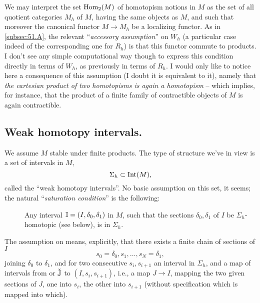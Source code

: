We may interpret the set $\operatorname{Hom}_2(M)$ of homotopism notions in $M$ as
the set of all quotient categories $M_h$ of $M$, having the same
objects as $M$, and such that moreover the canonical functor $M\to
M_h$ be a localizing functor. As in \ref{subsec:51.A}, the relevant
``\emph{accessory assumption}'' on $W_h$ (a particular case indeed of
the corresponding one for $R_h$) is that this functor commute to
products. I don't see any simple computational way though to express
this condition directly in terms of $W_h$, as previously in terms of
$R_h$. I would only like to notice here a consequence of this
assumption (I doubt it is equivalent to it), namely that \emph{the
  cartesian product of two homotopisms is again a homotopism} -- which
implies, for instance, that the product of a finite family
of contractible objects of $M$ is again contractible.

\subsection[Homotopy interval structures]{Weak homotopy intervals.}
\label{subsec:51.C}
We assume $M$ stable under finite products. The type of structure
we've in view is a set of intervals in $M$,
\[\Sigma_h\subset\operatorname{Int}(M),\]
called the ``weak homotopy intervals''. No basic assumption on this
set, it seems; the natural ``\emph{saturation condition}'' is the
following:
\begin{description}
\item[] Any interval
  ${\mathbb{I}}=(I,\delta_0,\delta_1)$ in $M$, such that the sections
  $\delta_0,\delta_1$ of $I$ be $\Sigma_h$-homotopic (see below), is
  in $\Sigma_h$.
\end{description}

The assumption on \bI{} means, explicitly, that there exists a finite
chain of sections of $I$
\[s_0=\delta_0, s_1, \dots, s_N=\delta_1,\]
joining $\delta_0$ to $\delta_1$, and for two consecutive
$s_i,s_{i+1}$ an interval \bJ{} in $\Sigma_h$, and a map of intervals
from \bJ{} or $\check{{\mathbb{J}}}$ to $(I,s_i,s_{i+1})$, i.e., a map $J\to I$,
mapping the two given sections of $J$, one into $s_i$, the other into
$s_{i+1}$ (without specification which is mapped into which).

